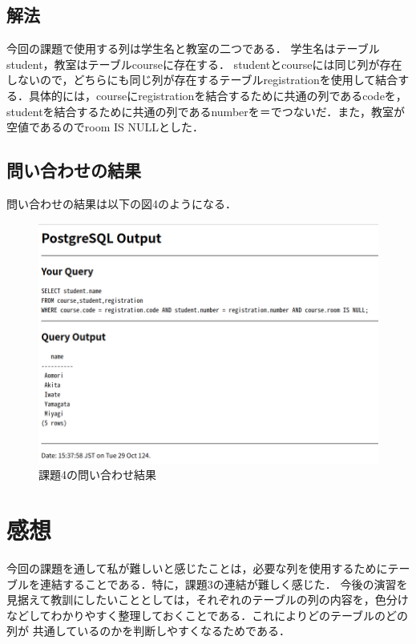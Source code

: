 \documentclass[dvipdfmx]{jarticle}
\begin{document}
\subsection{解法}
今回の課題で使用する列は学生名と教室の二つである．
学生名はテーブルstudent，教室はテーブルcourseに存在する．
studentとcourseには同じ列が存在しないので，どちらにも同じ列が存在するテーブルregistrationを使用して結合する．具体的には，courseにregistrationを結合するために共通の列であるcodeを，
studentを結合するために共通の列であるnumberを＝でつないだ．また，教室が空値であるのでroom IS NULLとした．
\subsection{問い合わせの結果}
問い合わせの結果は以下の図4のようになる．
\begin{figure}[h]
    \centering
    \includegraphics[width=12cm]{kadai4.png}
    \caption{課題4の問い合わせ結果}
\end{figure}
\section{感想}
今回の課題を通して私が難しいと感じたことは，必要な列を使用するためにテーブルを連結することである．特に，課題3の連結が難しく感じた．
今後の演習を見据えて教訓にしたいこととしては，それぞれのテーブルの列の内容を，色分けなどしてわかりやすく整理しておくことである．これによりどのテーブルのどの列が
共通しているのかを判断しやすくなるためである．
\end{document}
